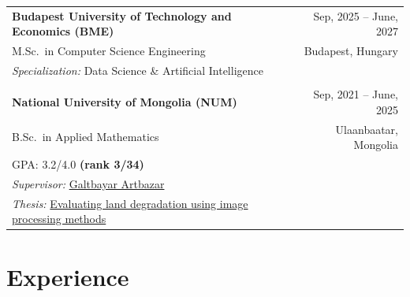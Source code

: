 \documentclass[a4paper,12pt]{article}
\begin{document}
\begin{tabularx}{\linewidth}{@{}l X r@{}}

\textbf{Budapest University of Technology and Economics (BME)} & & Sep, 2025 -- June, 2027\\

M.Sc.\ in Computer Science Engineering & & Budapest, Hungary \\


\textit{Specialization:} Data Science \& Artificial Intelligence \\


& & \\



\textbf{National University of Mongolia (NUM)} & & Sep, 2021 -- June, 2025 \\

B.Sc.\ in Applied Mathematics & & Ulaanbaatar, Mongolia \\
GPA: 3.2/4.0 \textbf{(rank 3/34)}\\
\textit{Supervisor:} \href{https://scholar.google.com/citations?user=oy6Pcz4AAAAJ\&hl=en}{Galtbayar Artbazar} \\

\textit{Thesis:} \href{https://drive.google.com/file/d/1GcDefePBMeKzups5SYEcjHAO8btNjAH7/view?usp=sharing}{Evaluating land degradation using image processing methods} & & \\


\end{tabularx}


\section{Experience}
\end{document}
